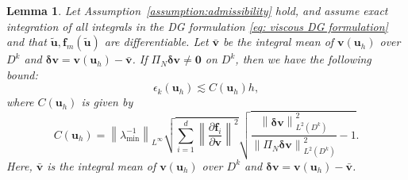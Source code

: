 \documentclass{elsarticle}
\theoremstyle{definition}
\theoremstyle{plain}
\newtheorem{lemma}{Lemma}
\theoremstyle{plain}
\newcommand{\pd}[2]{\frac{\partial#1}{\partial#2}}
\newcommand{\nor}[1]{\left\| #1 \right\|} %
\newcommand{\LRb}[1]{\left| #1 \right|} %
\newcommand{\refone}[1]{{\color{red}#1}}
\newcommand{\reftwo}[1]{{\color{blue}#1}}
\renewcommand{\refone}[1]{#1}
\renewcommand{\reftwo}[1]{#1}
\newcommand{\note}[1]{{\color{blue}{#1}}}
\begin{document}

\begin{lemma} \label{lemma: epsilon bound}
Let Assumption~\ref{assumption:admissibility} hold, and assume  exact integration of all integrals in the DG formulation \eqref{eq: viscous DG formulation} and that $\tilde{\bm{u}}, \bm{f}_m(\tilde{\bm{u}})$ are differentiable. \reftwo{Let $\bar{\bm{v}}$ be the integral mean of $\bm{v}(\bm{u}_h)$ over $D^k$ and $\bm{\delta v} = \bm{v}(\bm{u}_h) - \bar{\bm{v}}$. If $\Pi_N \bm{\delta v} \neq \bm{0}$ on $D^k$, then we have the following bound:}
\[
\epsilon_k(\bm{u}_h) \lesssim C(\bm{u}_h) h \refone{,}
\]
where $C(\bm{u}_h)$ is given by
\[
C(\bm{u}_h) = \nor{\lambda_{\min}^{-1}}_{L^\infty} \sqrt{\sum_{i=1}^d \nor{\pd{\bm{f}_i}{\bm{v}}}^2}
\sqrt{\frac{\nor{\bm{\delta v}}_{L^2(D^k)}^2}{\nor{\Pi_N \bm{\delta v}}_{L^2(D^k)}^2}-1}.
\]
Here, $\bar{\bm{v}}$ is the integral mean of $\bm{v}(\bm{u}_h)$ over $D^k$ and $\bm{\delta v} = \bm{v}(\bm{u}_h) - \bar{\bm{v}}$.
\end{lemma}
\end{document}
